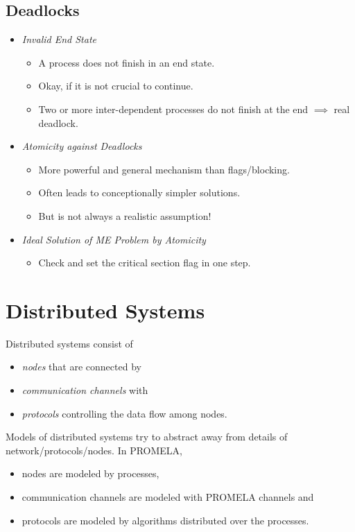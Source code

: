 		\subsection{Deadlocks}
			\begin{itemize}
				\item \textit{Invalid End State}
					\begin{itemize}
						\item A process does not finish in an end state.
						\item Okay, if it is not crucial to continue.
						\item Two or more inter-dependent processes do not finish at the end \(\implies\) real deadlock.
					\end{itemize}
				\item \textit{Atomicity against Deadlocks}
					\begin{itemize}
						\item More powerful and general mechanism than flags/blocking.
						\item Often leads to conceptionally simpler solutions.
						\item But is not always a realistic assumption!
					\end{itemize}
				\item \textit{Ideal Solution of ME Problem by Atomicity}
					\begin{itemize}
						\item Check and set the critical section flag in one  step.
					\end{itemize}
			\end{itemize}

	\section{Distributed Systems}
		\label{sec:distributed}
	
		
		Distributed systems consist of
		\begin{itemize}
			\item \textit{nodes} that are connected by
			\item \textit{communication channels} with
			\item \textit{protocols} controlling the data flow among nodes.
		\end{itemize}
		Models of distributed systems try to abstract away from details of network/protocols/nodes. In PROMELA,
		\begin{itemize}
			\item nodes are modeled by processes,
			\item communication channels are modeled with PROMELA channels and
			\item protocols are modeled by algorithms distributed over the processes.
		\end{itemize}

